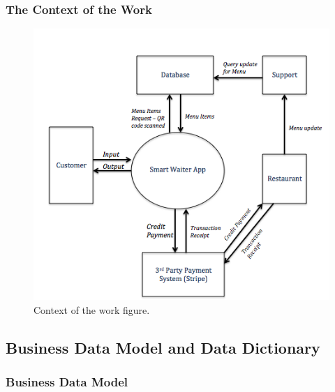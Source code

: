 \documentclass[12pt, titlepage]{article}
\begin{document}
\subsubsection{The Context of the Work}
\begin{figure}[H]
  \centering
\includegraphics{Context.png}
\caption{Context of the work figure.}
\end{figure}
\subsection{Business Data Model and Data Dictionary}
\subsubsection{Business Data Model}
\end{document}
